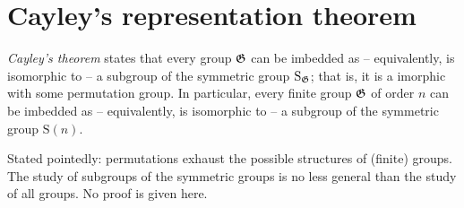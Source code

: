 \section{Cayley's representation theorem}
{\em Cayley's theorem} states that every group ${\frak G}$ can be imbedded as
--
equivalently, is isomorphic to -- a subgroup
of the symmetric group $\textrm{S}_{\frak G}$; that is, it is a imorphic with some permutation group.
In particular, every finite group ${\frak G}$ of order $n$  can be imbedded as
--
equivalently, is isomorphic to -- a subgroup
of the symmetric group $\textrm{S}(n)$.

Stated pointedly: permutations exhaust the possible structures of (finite) groups.
The study of subgroups of the symmetric groups is no less general than the study of all groups.
No proof is given here.






\begin{center}
{\color{olive}   \Huge
 \decosix
}
\end{center}
